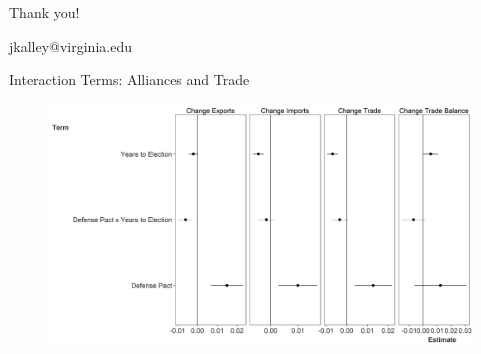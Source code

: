 \documentclass[12pt]{beamer}
\begin{document}



\begin{frame}[standout]

Thank you! 

jkalley@virginia.edu

\end{frame}


\appendix 




\begin{frame}{Interaction Terms: Alliances and Trade}

\begin{figure}[htbp]
	\centering
		\includegraphics[width=.90\textwidth]{trade-inter-terms.png}
\end{figure}


\end{frame}


\end{document}
